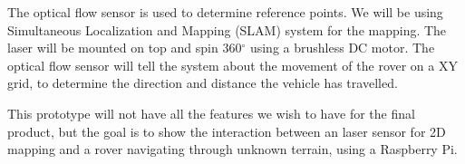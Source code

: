 The optical flow sensor is used to determine reference points. We will be using Simultaneous Localization and Mapping (SLAM) system for the mapping. The laser will be mounted on top and spin 360$^{\circ}$ using a brushless DC motor. The optical flow sensor will tell the system about the movement of the rover on a XY grid, to determine the direction and distance the vehicle has travelled. 

This prototype will not have all the features we wish to have for the final product, but the goal is to show the interaction between an laser sensor for 2D mapping and a rover navigating through unknown terrain, using a Raspberry Pi.

